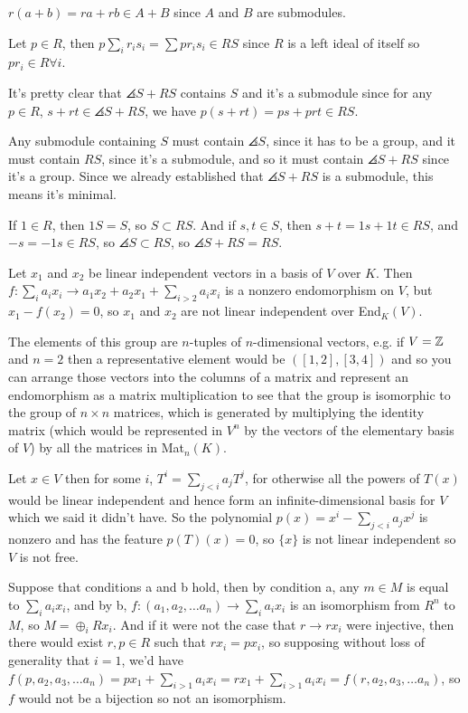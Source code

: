 \documentclass[11pt, oneside]{article}   	%
\begin{document}
\item $r(a + b) = ra + rb \in A + B$ since $A$ and $B$ are submodules.
\ee
\item \be
\item Let $p \in R$, then $p\sum_ir_is_i = \sum pr_is_i \in RS$ since $R$ is a left ideal of itself so $pr_i \in R \forall i$.
\item It's pretty clear that $\angles{S} + RS$ contains $S$ and it's a submodule since for any $p \in R$, $s + rt \in \angles{S} + RS$, we have $p(s + rt) = ps + prt \in RS$.
\item Any submodule containing $S$ must contain $\angles{S}$, since it has to be a group, and it must contain $RS$, since it's a submodule, and so it must contain $\angles{S} + RS$ since it's a group. Since we already established that $\angles{S} + RS$ is a submodule, this means it's minimal.
\item If $1 \in R$, then $1S = S$, so $S \subset RS$. And if $s, t \in S$, then $s + t = 1s + 1t \in RS$, and $-s = -1s \in RS$, so $\angles{S} \subset RS$, so $\angles{S} + RS = RS$.
\ee
\item Let $x_1$ and $x_2$ be linear independent vectors in a basis of $V$ over $K$. Then $f: \sum_ia_ix_i \to a_1x_2 + a_2x_1 + \sum_{i>2}a_ix_i$ is a nonzero endomorphism on $V$, but $x_1 - f(x_2) = 0$, so $x_1$ and $x_2$ are not linear independent over End$_K(V)$.
\item The elements of this group are $n$-tuples of $n$-dimensional vectors, e.g. if $V = \mathbb{Z}$ and $n=2$ then a representative element would be $([1, 2], [3, 4])$ and so you can arrange those vectors into the columns of a matrix and represent an endomorphism as a matrix multiplication to see that the group is isomorphic to the group of $n\times n$ matrices, which is generated by multiplying the identity matrix (which would be represented in $V^n$ by the vectors of the elementary basis of $V$) by all the matrices in Mat$_n(K)$.
\item Let $x \in V$ then for some $i$, $T^i = \sum_{j < i}a_jT^j$, for otherwise all the powers of $T(x)$ would be linear independent and hence form an infinite-dimensional basis for $V$ which we said it didn't have. So the polynomial $p(x) = x^i - \sum_{j < i}a_jx^j$ is nonzero and has the feature $p(T)(x) = 0$, so $\{x\}$ is not linear independent so $V$ is not free.
\item Suppose that conditions a and b hold, then by condition a, any $m \in M$ is equal to $\sum_i a_ix_i$, and by b, $f: (a_1, a_2, \ldots a_n) \to \sum_ia_ix_i$ is an isomorphism from $R^n$ to $M$, so $M = \oplus_iRx_i$. And if it were not the case that $r \to rx_i$ were injective, then there would exist $r, p \in R$ such that $rx_i = px_i$, so supposing without loss of generality that $i = 1$, we'd have $f(p, a_2, a_3, \ldots a_n) = px_1 + \sum_{i > 1}a_ix_i = rx_1 + \sum_{i > 1}a_ix_i = f(r, a_2, a_3, \ldots a_n)$, so $f$ would not be a bijection so not an isomorphism.
\end{document}
